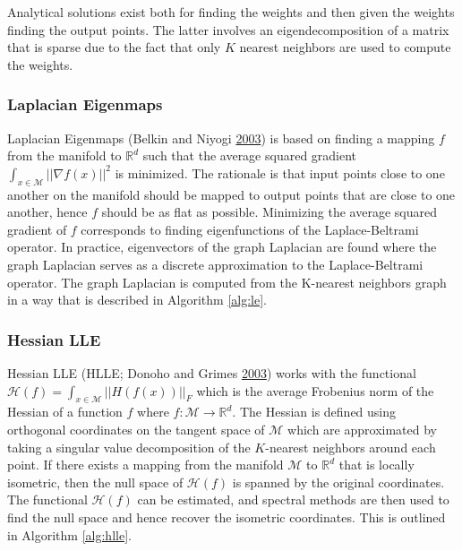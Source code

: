 \documentclass[12pt]{article}
\begin{document}
Analytical solutions exist both for finding the weights and then given the weights finding the output points. The latter involves an eigendecomposition of a matrix that is sparse due to the fact that only \(K\) nearest neighbors are used to compute the weights.

\hypertarget{laplacian-eigenmaps}{%
\subsubsection*{Laplacian Eigenmaps}\label{laplacian-eigenmaps}}

Laplacian Eigenmaps (Belkin and Niyogi \protect\hyperlink{ref-Belkin2003}{2003}) is based on finding a mapping \(f\) from the manifold to \(\mathbb{R}^d\) such that the average squared gradient \(\int_{x\in\mathcal{M}}||\nabla f(x)||^2\) is minimized. The rationale is that input points close to one another on the manifold should be mapped to output points that are close to one another, hence \(f\) should be as flat as possible. Minimizing the average squared gradient of \(f\) corresponds to finding eigenfunctions of the Laplace-Beltrami operator. In practice, eigenvectors of the graph Laplacian are found where the graph Laplacian serves as a discrete approximation to the Laplace-Beltrami operator. The graph Laplacian is computed from the K-nearest neighbors graph in a way that is described in Algorithm \ref{alg:le}.

\hypertarget{hessian-lle}{%
\subsubsection*{Hessian LLE}\label{hessian-lle}}

Hessian LLE (HLLE; Donoho and Grimes \protect\hyperlink{ref-Donoho2003-am}{2003}) works with the functional \(\mathcal{H}(f)=\int_{x\in\mathcal{M}}||H(f(x))||_F\) which is the average Frobenius norm of the Hessian of a function \(f\) where \(f:\mathcal{M}\rightarrow\mathbb{R}^d\). The Hessian is defined using orthogonal coordinates on the tangent space of \(\mathcal{M}\) which are approximated by taking a singular value decomposition of the \(K\)-nearest neighbors around each point. If there exists a mapping from the manifold \(\mathcal{M}\) to \(\mathbb{R}^d\) that is locally isometric, then the null space of \(\mathcal{H}(f)\) is spanned by the original coordinates. The functional \(\mathcal{H}(f)\) can be estimated, and spectral methods are then used to find the null space and hence recover the isometric coordinates. This is outlined in Algorithm \ref{alg:hlle}.
\end{document}

